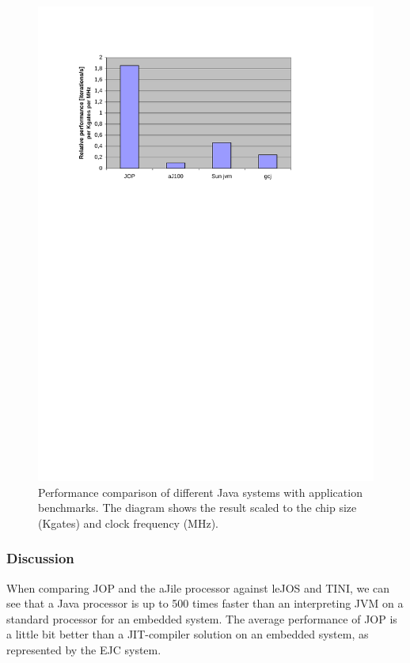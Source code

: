 \begin{figure}
    \centering
    \includegraphics[width=\excelwidth]{results/results_app_bench_double_scaled}
    \caption{Performance comparison of different Java systems with
    application benchmarks. The diagram shows the result scaled to
    the chip size (Kgates) and clock frequency (MHz).
    }
    \label{fig:results:app:bench:double:scaled}
\end{figure}


\subsubsection{Discussion}

When comparing JOP and the aJile processor against leJOS and TINI,
we can see that a Java processor is up to 500 times faster than an
interpreting JVM on a standard processor for an embedded system. The
average performance of JOP is a little bit better than a
JIT-compiler solution on an embedded system, as represented by the
EJC system.

